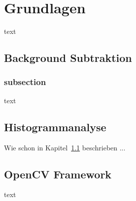\chapter{Grundlagen}\label{chp:Grundlageb}
text

\section{Background Subtraktion}\label{sec:Grundlage1}
\subsection{subsection}
text
\section{Histogrammanalyse}
Wie schon in Kapitel~\ref{sec:Grundlage1} beschrieben ...
\section{OpenCV Framework}\label{sec:OpenCV}
text